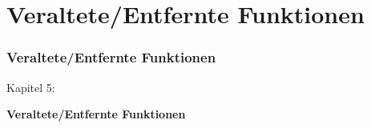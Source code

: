 %

\section{Veraltete/Entfernte Funktionen}
\begin{frame}[fragile]
	\frametitle{Veraltete/Entfernte Funktionen}

	\begin{center}\huge{Kapitel 5:}\end{center}
	\begin{center}\huge{\color{typo3darkgrey}\textbf{Veraltete/Entfernte Funktionen}}\end{center}

\end{frame}


